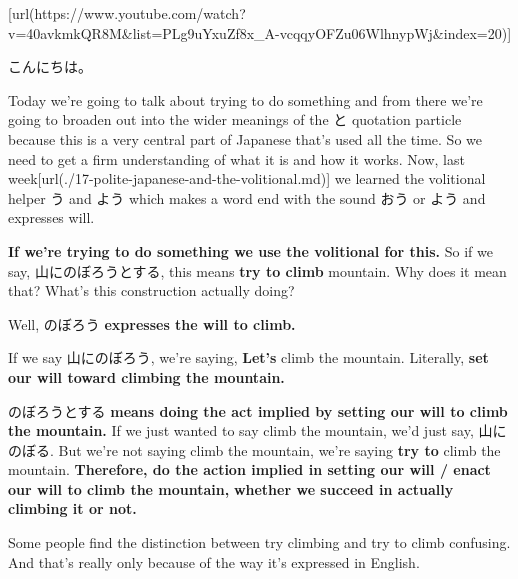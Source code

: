\startsectionlevel[title={{\bf 18. って = は?? Mysteries explained! -おうとする, とする, として, という, っていう}},reference={って-は-mysteries-explained--おうとする-とする-として-という-っていう}]

[url(https://www.youtube.com/watch?v=40avkmkQR8M&list=PLg9uYxuZf8x_A-vcqqyOFZu06WlhnypWj&index=20)]

こんにちは。

Today we're going to talk about trying to do something and from there we're going to broaden out into the wider meanings of the と quotation particle because this is a very central part of Japanese that's used all the time. So we need to get a firm understanding of what it is and how it works. Now, last week\goto{{[}17{]}}[url(./17-polite-japanese-and-the-volitional.md)] we learned the volitional helper う and よう which makes a word end with the sound おう or よう and expresses will.

{}

{\bf If we're trying to do something we use the volitional for this.} So if we say, 山にのぼろうとする, this means {\bf try to climb} mountain. Why does it mean that? What's this construction actually doing?

{}

Well, のぼろう {\bf expresses the will to climb.}

{}

If we say 山にのぼろう, we're saying, {\bf Let's} climb the mountain. Literally, {\bf set our will toward climbing the mountain.}

\startsectionlevel[title={おうとする / とする},reference={おうとする-とする}]

のぼろうとする {\bf means doing the act implied by setting our will to climb the mountain.} If we just wanted to say climb the mountain, we'd just say, 山にのぼる. But we're not saying climb the mountain, we're saying {\bf try to} climb the mountain. {\bf Therefore, do the action implied in setting our will / enact our will to climb the mountain,} {\bf whether we succeed in actually climbing it or not.}

Some people find the distinction between try climbing and try to climb confusing. And that's really only because of the way it's expressed in English.

{}

